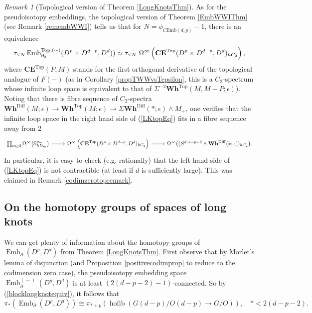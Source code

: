\documentclass[a4paper, oneside]{amsart}
\newcommand{\diff}{\mathrm{Diff}}
\newcommand{\emb}{\operatorname{Emb}}
\newcommand{\hofib}{\operatorname{hofib}}
\newcommand{\cemb}{C\mathrm{Emb}}
\newcommand{\1}{\mathds{1}}
\theoremstyle{remark}
\newtheorem{rem}[thm]{Remark}%
\theoremstyle{definition}
\newcommand{\geqs}{\scaleobj{0.85}{\geq}}
\newcommand{\leqs}{\scaleobj{0.85}{\leq}}
\newcommand{\s}{\mathbb{S}}
\newcommand{\CEsp}{\mathbf{CE}}
\newcommand{\Whsp}{\mathbf{Wh}^{\diff}}
\newcommand{\Whsptop}{\mathbf{Wh}^{\mathrm{Top}}}
\numberwithin{equation}{section}
\begin{document}
\begin{rem}[Topological version of Theorem \ref{LongKnotsThm}]
As for the pseudoisotopy embeddings, the topological version of Theorem \ref{EmbWWIThm} (see Remark \ref{remembWWI}) tells us that for $N=\phi_{\cemb(d,p)}-1$, there is an equivalence
\begin{equation}\label{LKtopEq}
\tau_{\leqs N}\emb_{\partial_0}^{\mathrm{Top},(\sim)}(D^p\times D^{d-p},D^d))\simeq \tau_{\leqs N}\ \Omega^\infty\left(\CEsp^{\mathrm{Top}}(D^p\times D^{d-p},D^d)_{hC_2}\right),
\end{equation}
where $\CEsp^{\mathrm{Top}}(P,M)$ stands for the first orthogonal derivative of the topological analogue of $F(-)$ (as in Corollary \ref{propTWWvsTepsilon}, this is a $C_2$-spectrum whose infinite loop space is equivalent to that of $\Sigma^{-2}\Whsptop(M,M-P;\epsilon)$). Noting that there is fibre sequence of $C_2$-spectra $\Whsp(M;\epsilon)\to \Whsptop(M;\epsilon)\to \Sigma\Whsp(*;\epsilon)\wedge M_+$, one verifies that the infinite loop space in the right hand side of (\ref{LKtopEq}) fits in a fibre sequence away from $2$
$$
\begin{tikzcd}
    \prod_{m\geqs 2} \Omega^{\infty}\big(\s^{\rho_m}_{hD_m}\big)\rar & \Omega^\infty\left(\CEsp^{\mathrm{Top}}(D^p\times D^{d-p},D^d)_{hC_2}\right)\rar
    &\Omega^\infty\big((S^{d\cdot\sigma-p-2}\wedge \Whsp(*;\epsilon))_{hC_2}\big).
\end{tikzcd}
$$
In particular, it is easy to check (e.g. rationally) that the left hand side of (\ref{LKtopEq}) is not contractible (at least if $d$ is sufficiently large). This was claimed in Remark \ref{codimzerotopremark}.
\end{rem}






\subsection{On the homotopy groups of spaces of long knots}\label{htpyLKsection} We can get plenty of information about the homotopy groups of $\emb_\partial(D^p,D^d)$ from Theorem \ref{LongKnotsThm}. First observe that by Morlet's lemma of disjunction \cite[Thm. 3.1]{BurgLashRoth} (and Proposition \ref{positivecodimprop} to reduce to the codimension zero case), the pseudoisotopy embedding space $\emb_\partial^{(\sim)}(D^p,D^d)$ is at least $(2(d-p-2)-1)$-connected. So by (\ref{blocklongknotequiv}), it follows that
\begin{equation}\label{lowerhtpygroupslongknots}
    \pi_*(\emb_\partial(D^p,D^d))\cong \pi_{*+p}(\hofib(G(d-p)/O(d-p)\to G/O)), \quad *<2(d-p-2).
\end{equation}
\end{document}
